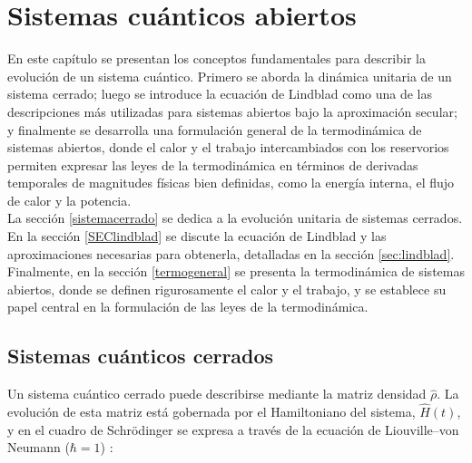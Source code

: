 


\chapter{Sistemas cuánticos abiertos}

En este capítulo se presentan los conceptos fundamentales para describir la evolución de un sistema cuántico. 
Primero se aborda la dinámica unitaria de un sistema cerrado; luego se introduce la ecuación de Lindblad como una de las descripciones más utilizadas para sistemas abiertos bajo la aproximación secular; y finalmente se desarrolla una formulación general de la termodinámica de sistemas abiertos, donde el calor y el trabajo intercambiados con los reservorios permiten expresar las leyes de la termodinámica en términos de derivadas temporales de magnitudes físicas bien definidas, como la energía interna, el flujo de calor y la potencia.
\\

La sección \ref{sistemacerrado} se dedica a la evolución unitaria de sistemas cerrados. 
En la sección \ref{SEClindblad} se discute la ecuación de Lindblad y las aproximaciones necesarias para obtenerla, detalladas en la sección \ref{sec:lindblad}. 
Finalmente, en la sección \ref{termogeneral} se presenta la termodinámica de sistemas abiertos, donde se definen rigurosamente el calor y el trabajo, y se establece su papel central en la formulación de las leyes de la termodinámica.

\section{Sistemas cuánticos cerrados}
Un sistema cuántico cerrado puede describirse mediante la matriz densidad $\hat{\rho}$. La evolución de esta matriz está gobernada por el Hamiltoniano del sistema, $\hat{H}(t)$, y en el cuadro de Schrödinger se expresa a través de la ecuación de Liouville--von Neumann ($\hbar = 1$) \cite{breuer2002theory}:
\label{sistemacerrado}

